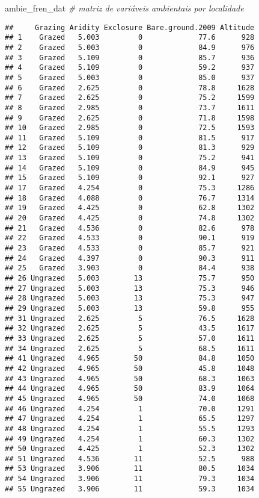 \documentclass[
]{book}
\newenvironment{Shaded}{\begin{snugshade}}{\end{snugshade}}
\newcommand{\CommentTok}[1]{\textcolor[rgb]{0.56,0.35,0.01}{\textit{#1}}}
\newcommand{\NormalTok}[1]{#1}
\begin{document}
\begin{Shaded}
\begin{Highlighting}[]
\NormalTok{ambie_fren_dat }\CommentTok{# matriz de variáveis ambientais por localidade}
\end{Highlighting}
\end{Shaded}

\begin{verbatim}
##     Grazing Aridity Exclosure Bare.ground.2009 Altitude
## 1    Grazed   5.003         0             77.6      928
## 2    Grazed   5.003         0             84.9      976
## 3    Grazed   5.109         0             85.7      936
## 4    Grazed   5.109         0             59.2      937
## 5    Grazed   5.003         0             85.0      937
## 6    Grazed   2.625         0             78.8     1628
## 7    Grazed   2.625         0             75.2     1599
## 8    Grazed   2.985         0             73.7     1611
## 9    Grazed   2.625         0             71.8     1598
## 10   Grazed   2.985         0             72.5     1593
## 11   Grazed   5.109         0             81.5      917
## 12   Grazed   5.109         0             81.3      929
## 13   Grazed   5.109         0             75.2      941
## 14   Grazed   5.109         0             84.9      945
## 15   Grazed   5.109         0             92.1      927
## 17   Grazed   4.254         0             75.3     1286
## 18   Grazed   4.088         0             76.7     1314
## 19   Grazed   4.425         0             62.8     1302
## 20   Grazed   4.425         0             74.8     1302
## 21   Grazed   4.536         0             82.6      978
## 22   Grazed   4.533         0             90.1      919
## 23   Grazed   4.533         0             85.7      921
## 24   Grazed   4.397         0             90.3      911
## 25   Grazed   3.903         0             84.4      938
## 26 Ungrazed   5.003        13             75.7      950
## 27 Ungrazed   5.003        13             75.3      946
## 28 Ungrazed   5.003        13             75.3      947
## 29 Ungrazed   5.003        13             59.8      955
## 31 Ungrazed   2.625         5             76.5     1628
## 32 Ungrazed   2.625         5             43.5     1617
## 33 Ungrazed   2.625         5             57.0     1611
## 34 Ungrazed   2.625         5             68.5     1611
## 41 Ungrazed   4.965        50             84.8     1050
## 42 Ungrazed   4.965        50             45.8     1048
## 43 Ungrazed   4.965        50             68.3     1063
## 44 Ungrazed   4.965        50             83.9     1064
## 45 Ungrazed   4.965        50             74.0     1068
## 46 Ungrazed   4.254         1             70.0     1291
## 47 Ungrazed   4.254         1             65.5     1297
## 48 Ungrazed   4.254         1             55.5     1293
## 49 Ungrazed   4.254         1             60.3     1302
## 50 Ungrazed   4.425         1             52.3     1302
## 51 Ungrazed   4.536        11             52.5      988
## 53 Ungrazed   3.906        11             80.5     1034
## 54 Ungrazed   3.906        11             79.3     1034
## 55 Ungrazed   3.906        11             59.3     1034
\end{verbatim}
\end{document}
